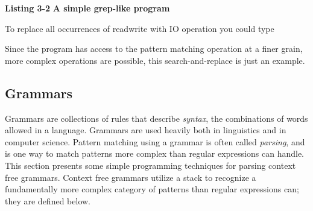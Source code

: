 \bigskip

{\sffamily\bfseries Listing 3-2}
{\sffamily\bfseries A simple grep-like program}


To replace all occurrences of
{\textquotedbl}read{\textbar}write{\textquotedbl} with
{\textquotedbl}IO operation{\textquotedbl} you could type 


Since the program has access to the pattern matching operation at a
finer grain, more complex operations are possible, this
search-and-replace is just an example.

\subsection{Grammars}

Grammars are collections of rules that describe
\textit{syntax}, the combinations of words allowed in a
language. Grammars are used heavily both in linguistics and in computer
science. Pattern matching using a grammar is
often called \textit{parsing}, and is one way to match
patterns more complex than regular expressions can handle. This section
presents some simple programming techniques for parsing context free
grammars. Context free grammars utilize a stack to
recognize a fundamentally more complex category of patterns than
regular expressions can; they are defined below.

